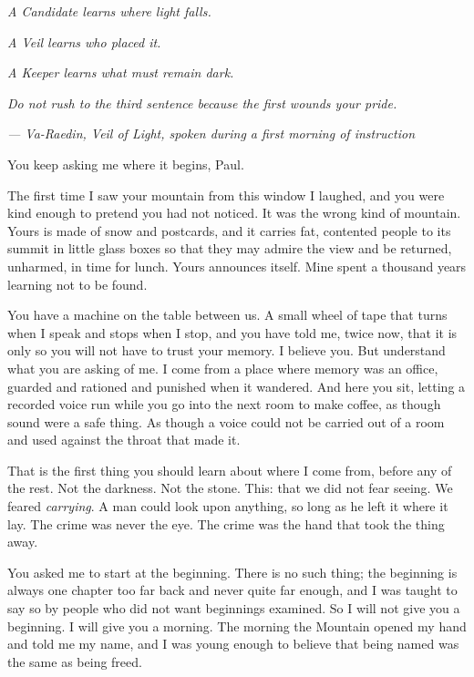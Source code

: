 
\noindent \textit{A Candidate learns where light falls.}\par
\noindent \textit{A Veil learns who placed it.}\par
\noindent \textit{A Keeper learns what must remain dark.}\par
\noindent \textit{Do not rush to the third sentence because the first wounds your pride.}\par
\noindent \textit{--- Va-Raedin, Veil of Light, spoken during a first morning of instruction}\par

\ornament

You keep asking me where it begins, Paul.\par

The first time I saw your mountain from this window I laughed, and you were kind enough to pretend you had not noticed. It was the wrong kind of mountain. Yours is made of snow and postcards, and it carries fat, contented people to its summit in little glass boxes so that they may admire the view and be returned, unharmed, in time for lunch. Yours announces itself. Mine spent a thousand years learning not to be found.\par

You have a machine on the table between us. A small wheel of tape that turns when I speak and stops when I stop, and you have told me, twice now, that it is only so you will not have to trust your memory. I believe you. But understand what you are asking of me. I come from a place where memory was an office, guarded and rationed and punished when it wandered. And here you sit, letting a recorded voice run while you go into the next room to make coffee, as though sound were a safe thing. As though a voice could not be carried out of a room and used against the throat that made it.\par

That is the first thing you should learn about where I come from, before any of the rest. Not the darkness. Not the stone. This: that we did not fear seeing. We feared \textit{carrying}. A man could look upon anything, so long as he left it where it lay. The crime was never the eye. The crime was the hand that took the thing away.\par

You asked me to start at the beginning. There is no such thing; the beginning is always one chapter too far back and never quite far enough, and I was taught to say so by people who did not want beginnings examined. So I will not give you a beginning. I will give you a morning. The morning the Mountain opened my hand and told me my name, and I was young enough to believe that being named was the same as being freed.\par

